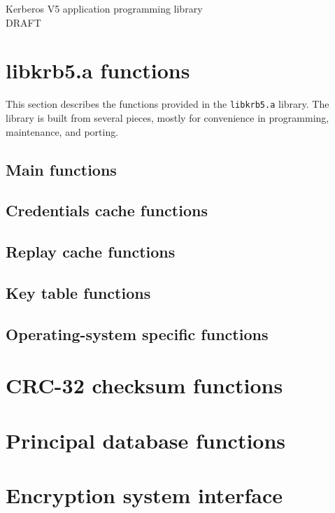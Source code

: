 \setlength{\oddsidemargin}{0.25in}
\setlength{\evensidemargin}{-0.25in}
\setlength{\topmargin}{-.5in}
\setlength{\textheight}{9in}
\setlength{\parskip}{.1in}
\setlength{\parindent}{2em}
\setlength{\textwidth}{6.25in}
\makeindex
\pagestyle{headings}

\begin{center}
{\Huge Kerberos V5 application programming library} \\
{\Large DRAFT}
\end{center}
\section{libkrb5.a functions}
This section describes the functions provided in the {\tt libkrb5.a}
library.  The library is built from several pieces, mostly for convenience in
programming, maintenance, and porting.
\subsection{Main functions}


\subsection{Credentials cache functions}


\subsection{Replay cache functions}


\subsection{Key table functions}


\subsection{Operating-system specific functions}


\section{CRC-32 checksum functions}


\section{Principal database functions}



\section{Encryption system interface}


\appendix
\cleardoublepage


